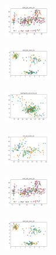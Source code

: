 \begin{figure}[H]
\begin{subfigure}
        \centering
        \includegraphics[width=0.234\textwidth]{img/hs/ecoli_set_const_10_589741062_clust.png}
    \end{subfigure}
    \hfill
    \begin{subfigure}
        \centering
        \includegraphics[width=0.234\textwidth]{img/hs/rand_set_const_10_589741062_clust.png}
    \end{subfigure}
    \hfill
    \begin{subfigure}
        \centering
        \includegraphics[width=0.234\textwidth]{img/hs/newthyroid_set_const_10_589741062_clust.png}
    \end{subfigure}
    \hfill
    \begin{subfigure}
        \centering
        \includegraphics[width=0.234\textwidth]{img/hs/iris_set_const_10_277451237_clust.png}
    \end{subfigure}
    \hfill
    \begin{subfigure}
        \centering
        \includegraphics[width=0.234\textwidth]{img/hs/ecoli_set_const_10_277451237_clust.png}
    \end{subfigure}
    \hfill
    \begin{subfigure}
        \centering
        \includegraphics[width=0.234\textwidth]{img/hs/rand_set_const_10_277451237_clust.png}

\end{subfigure}
\end{figure}
